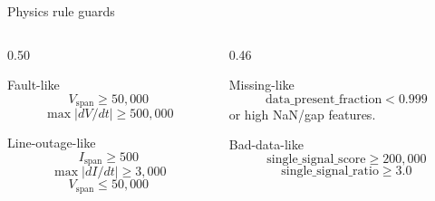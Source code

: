 \documentclass[10pt,aspectratio=169]{beamer}
\begin{document}
\begin{frame}{Physics rule guards}
\small
\begin{columns}[T,totalwidth=\textwidth]
\begin{column}{0.50\textwidth}
\begin{block}{Fault-like}
\[
V_{\mathrm{span}} \ge 50{,}000
\]
\[
\max |dV/dt| \ge 500{,}000
\]
\end{block}
\begin{block}{Line-outage-like}
\[
I_{\mathrm{span}} \ge 500
\]
\[
\max |dI/dt| \ge 3{,}000
\]
\[
V_{\mathrm{span}} \le 50{,}000
\]
\end{block}
\end{column}
\begin{column}{0.46\textwidth}
\begin{alertblock}{Missing-like}
\[
\mathrm{data\_present\_fraction}<0.999
\]
or high NaN/gap features.
\end{alertblock}
\begin{alertblock}{Bad-data-like}
\[
\mathrm{single\_signal\_score}\ge 200{,}000
\]
\[
\mathrm{single\_signal\_ratio}\ge 3.0
\]
\end{alertblock}
\end{column}
\end{columns}
\end{frame}
\end{document}
